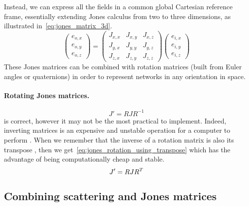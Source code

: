 Instead, we can express all the fields in a common global Cartesian reference frame, essentially extending Jones calculus from two to three dimensions, as illustrated in~\cref{eq:jones_matrix_3d}.
\begin{equation}
    \begin{pmatrix}
        e_{o, x}\\
        e_{o, y}\\
        e_{o, z}
    \end{pmatrix}
    =
    \begin{pmatrix}
        J_{x, x}   &   J_{x, y}   &   J_{x, z} \\
        J_{y, x}   &   J_{y, y}   &   J_{y, z} \\
        J_{z, x}   &   J_{z, y}   &   J_{z, z}
    \end{pmatrix}
    \begin{pmatrix}
        e_{i, x}\\
        e_{i, y}\\
        e_{i, z}
    \end{pmatrix}
    \label{eq:jones_matrix_3d}
\end{equation}
These Jones matrices can be combined with rotation matrices (built from Euler angles or quaternions) in order to represent networks in any orientation in space.

\paragraph{Rotating Jones matrices.}
\begin{equation}
    J' = R J R^{-1}
    \label{eq:jones_rotation_using_inverse}
\end{equation}
 is correct, however it may not be the most practical to implement.
Indeed, inverting matrices is an expensive and unstable operation for a computer to perform%
.
When we remember that the inverse of a rotation matrix is also its transpose%
,
then we get~\cref{eq:jones_rotation_using_transpose} which has the advantage of being computationally cheap and stable.
\begin{equation}
    J' = R J R^T
    \label{eq:jones_rotation_using_transpose}
\end{equation}

\subsection{Combining scattering and Jones matrices}



